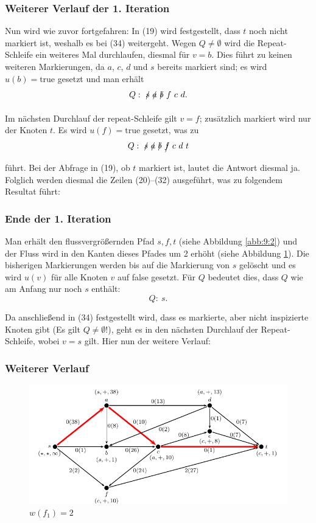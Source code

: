 \documentclass[smaller]{beamer}
\begin{document}
\begin{frame}
\frametitle{Weiterer Verlauf der 1. Iteration}
Nun wird wie zuvor fortgefahren: In (19) wird festgestellt, dass $t$ noch nicht markiert ist, weshalb es bei (34) weitergeht. Wegen $Q \neq \emptyset$ wird die Repeat-Schleife ein weiteres Mal durchlaufen, diesmal für $v=b$. Dies führt zu keinen weiteren Markierungen, da $a$, $c$, $d$ und $s$ bereits markiert sind; es wird $u(b) = \text{true}$ gesetzt und man erhält
\[
Q:\ \xout{s}\ \xout{a}\ \xout{b}\ f\ c\ d.
\]

Im nächsten Durchlauf der repeat-Schleife gilt $v=f$; zusätzlich markiert wird nur der Knoten $t$. Es wird $u(f) = \text{true}$ gesetzt, was zu
\[
Q:\ \xout{s}\ \xout{a}\ \xout{b}\ \xout{f}\ c\ d\ t
\]
führt. Bei der Abfrage in (19), ob $t$ markiert ist, lautet \alert{die Antwort diesmal ja.} Folglich werden diesmal die Zeilen (20)--(32) ausgeführt, was zu folgendem Resultat führt: 
\end{frame}

\begin{frame}
 \frametitle{Ende der 1. Iteration}
 Man erhält den flussvergrößernden Pfad $s,f,t$ (siehe Abbildung \ref{abb:9:2}) und der Fluss wird in den Kanten dieses Pfades um 2 erhöht (siehe Abbildung \ref{abb:9:3}). Die bisherigen Markierungen werden bis auf die Markierung von $s$ gelöscht und es wird $u(v)$ für alle Knoten $v$ auf false gesetzt. Für $Q$ bedeutet dies, dass $Q$ wie am Anfang nur noch $s$ enthält:
\[
Q:\ s.
\]

Da anschließend in (34) festgestellt wird, dass es markierte, aber nicht inspizierte Knoten gibt (Es gilt $Q \neq \emptyset$!), \alert{geht es in den nächsten Durchlauf der Repeat-Schleife, wobei $v=s$ gilt.} Hier nun der weitere Verlauf:
\end{frame}

\begin{frame}
 \frametitle{Weiterer Verlauf}
 \begin{center}
  \begin{figure}
   \includegraphics{fig24.pdf}
   \caption{$w(f_1) = 2$}
   \label{abb:9:3}
  \end{figure}
\end{center}
\end{frame}
\end{document}
